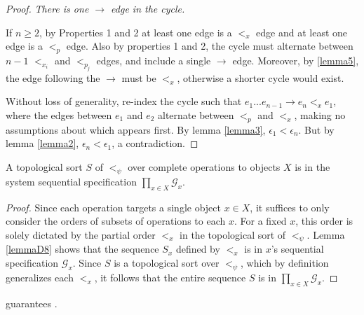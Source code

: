 \begin{proof}
 \textit{There is one $\rightarrow$ edge in the cycle.}



If $n \geq 2$, by Properties 1 and 2 at least one edge is a $<_x$ edge and at least one edge is a $<_p$ edge. Also by properties 1 and 2, the cycle must alternate between $n-1$ $<_{x_i}$ and $<_{p_j}$ edges, and include a single $\rightarrow$ edge. Moreover, by \ref{lemma5}, the edge following the $\rightarrow$ must be $<_x$, otherwise a shorter cycle would exist. 

Without loss of generality, re-index the cycle such that $e_1 ... e_{n-1} \rightarrow e_n <_x e_1$, where the edges between $e_1$ and $e_2$ alternate between $<_p$ and $<_x$, making no assumptions about which appears first. By lemma \ref{lemma3}, $\epsilon_1 < \epsilon_n$. But by lemma \ref{lemma2}, $\epsilon_n < \epsilon_1$, a contradiction.
\end{proof}


\begin{lem}
    \label{lemmaD14}
    A topological sort $S$ of $<_\psi$ over complete operations to objects $X$ is in the system sequential specification $\prod_{x \in X}\mathcal{G}_x$.
\end{lem}
\begin{proof}
    Since each operation targets a single object $x \in X$, it suffices to only consider the orders of subsets of operations to each $x$. For a fixed $x$, this order is solely dictated by the partial order $<_x$ in the topological sort of $<_\psi$. Lemma \ref{lemmaD8} shows that the sequence $S_x$ defined by $<_x$ is in $x$'s sequential specification $\mathcal{G}_x$. Since $S$ is a topological sort over $<_\psi$, which by definition generalizes each $<_x$, it follows that the entire sequence $S$ is in $\prod_{x \in X}\mathcal{G}_x$.
\end{proof}

\begin{thm}
    \sys{} guarantees \mdllong{}.
\end{thm}

